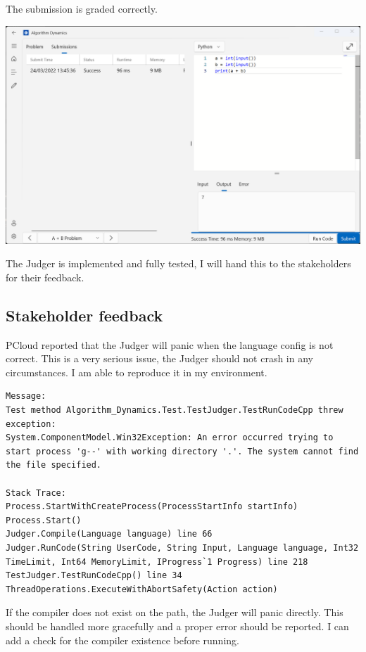 \documentclass[a4paper]{report}
\begin{document}
The submission is graded correctly.

\includegraphics[width=\textwidth, height=\textheight, keepaspectratio]{CodingPage-Submit}

The Judger is implemented and fully tested, I will hand this to the stakeholders for their feedback.

\subsection{Stakeholder feedback}

PCloud reported that the Judger will panic when the language config is not correct. This is a very serious issue, the Judger should not crash in any circumstances. I am able to reproduce it in my environment.

\begin{verbatim}
Message:
Test method Algorithm_Dynamics.Test.TestJudger.TestRunCodeCpp threw exception:
System.ComponentModel.Win32Exception: An error occurred trying to start process 'g--' with working directory '.'. The system cannot find the file specified.

Stack Trace:
Process.StartWithCreateProcess(ProcessStartInfo startInfo)
Process.Start()
Judger.Compile(Language language) line 66
Judger.RunCode(String UserCode, String Input, Language language, Int32 TimeLimit, Int64 MemoryLimit, IProgress`1 Progress) line 218
TestJudger.TestRunCodeCpp() line 34
ThreadOperations.ExecuteWithAbortSafety(Action action)
\end{verbatim}

If the compiler does not exist on the path, the Judger will panic directly. This should be handled more gracefully and a proper error should be reported. I can add a check for the compiler existence before running.
\end{document}
